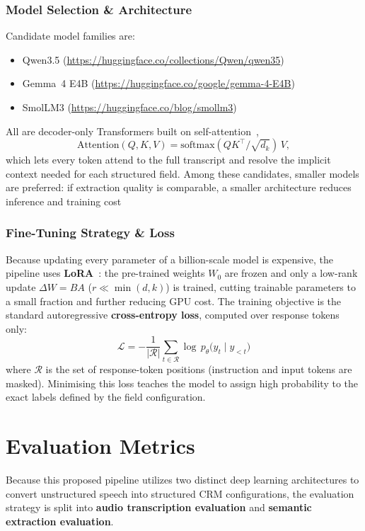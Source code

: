 \documentclass[ 
  journal=medium,
  manuscript={Contextual Information Extraction of Customer Data from Sales audio calls},
  year=2026,
  volume=0,
]{cup-journal}
\begin{document}
\subsubsection{Model Selection \& Architecture}
Candidate model families are:
\begin{itemize}
  \item Qwen3.5 (\url{https://huggingface.co/collections/Qwen/qwen35})
  \item Gemma~4 E4B (\url{https://huggingface.co/google/gemma-4-E4B})
  \item SmolLM3 (\url{https://huggingface.co/blog/smollm3})
\end{itemize}
All are decoder-only Transformers built on self-attention~\cite{vaswani2017attention},
\[
  \mathrm{Attention}(Q,K,V)=\mathrm{softmax}({QK^{\top}}/{\sqrt{d_k}})\,V,
\]
which lets every token attend to the full transcript and resolve the implicit context needed for each structured field.
Among these candidates, smaller models are preferred: if extraction quality is comparable, a smaller architecture reduces inference and training cost

\subsubsection{Fine-Tuning Strategy \& Loss}
Because updating every parameter of a billion-scale model is expensive, the pipeline uses \textbf{LoRA}~\cite{hu2022lora}: the pre-trained weights $W_0$ are frozen and only a low-rank update $\Delta W = BA$ ($r\!\ll\!\min(d,k)$) is trained, cutting trainable parameters to a small fraction and further reducing GPU cost.
The training objective is the standard autoregressive \textbf{cross-entropy loss}, computed over response tokens only:
\begin{equation}
  \mathcal{L}
    = -\frac{1}{|\mathcal{R}|}
      \sum_{t \in \mathcal{R}}
        \log\, p_\theta\!\bigl(y_t \mid y_{<t}\bigr)
  \label{eq:ce_loss}
\end{equation}
where $\mathcal{R}$ is the set of response-token positions (instruction and input tokens are masked).
Minimising this loss teaches the model to assign high probability to the exact labels defined by the field configuration.

\section{Evaluation Metrics}
Because this proposed pipeline utilizes two distinct deep learning architectures to convert unstructured speech into structured CRM configurations, the evaluation strategy is split into \textbf{audio transcription evaluation} and \textbf{semantic extraction evaluation}.
\end{document}
